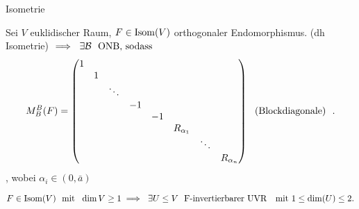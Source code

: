 \documentclass[class=article, crop=false]{standalone}
\begin{document}
\begin{zettel}{Isometrie}
\begin{theorem}
	Sei $V$ euklidischer Raum, $F \in  \operatorname{Isom}(V)$  orthogonaler Endomorphismus. (dh Isometrie) $\implies \exists \mathcal{B} \tx{ ONB, sodass }$
	\[
		M_B^B(F) =
		\begin{pmatrix}
			1 &   &        &    &    &              &        &              \\
			  & 1 &        &    &    &              &        &              \\
			  &   & \ddots &    &    &              &        &              \\
			  &   &        & -1 &    &              &        &              \\
			  &   &        &    & -1 &              &        &              \\
			  &   &        &    &    & R_{\alpha_1} &        &              \\
			  &   &        &    &    &              & \ddots &              \\
			  &   &        &    &    &              &        & R_{\alpha_n} \\
		\end{pmatrix} \tx{ (Blockdiagonale) }
	.\],
	wobei $\alpha_i \in  (0,\bar{a})$
\end{theorem}
\begin{lemma}
	\[
		F \in \Isome(V) \tx{ mit }  \dim V \geq 1 \implies  \exists  U \leq  V \tx{ F-invertierbarer UVR } \tx{mit} 1 \leq \dim(U) \leq  2
	.\]
\end{lemma}

\end{zettel}
\end{document}
